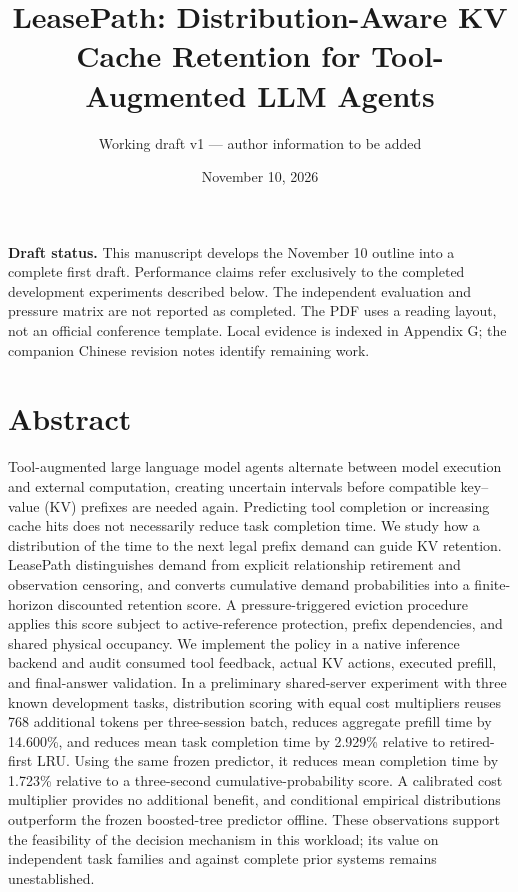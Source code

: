 \documentclass[
  english,
  10pt,
]{article}
\title{LeasePath: Distribution-Aware KV Cache Retention for
Tool-Augmented LLM Agents}
\author{Working draft v1 --- author information to be added}
\date{November 10, 2026}
\begin{document}
\maketitle

\textbf{Draft status.} This manuscript develops the November 10 outline
into a complete first draft. Performance claims refer exclusively to the
completed development experiments described below. The independent
evaluation and pressure matrix are not reported as completed. The PDF
uses a reading layout, not an official conference template. Local
evidence is indexed in Appendix G; the companion Chinese revision notes
identify remaining work.

\section{Abstract}\label{abstract}

Tool-augmented large language model agents alternate between model
execution and external computation, creating uncertain intervals before
compatible key--value (KV) prefixes are needed again. Predicting tool
completion or increasing cache hits does not necessarily reduce task
completion time. We study how a distribution of the time to the next
legal prefix demand can guide KV retention. LeasePath distinguishes
demand from explicit relationship retirement and observation censoring,
and converts cumulative demand probabilities into a finite-horizon
discounted retention score. A pressure-triggered eviction procedure
applies this score subject to active-reference protection, prefix
dependencies, and shared physical occupancy. We implement the policy in
a native inference backend and audit consumed tool feedback, actual KV
actions, executed prefill, and final-answer validation. In a preliminary
shared-server experiment with three known development tasks,
distribution scoring with equal cost multipliers reuses 768 additional
tokens per three-session batch, reduces aggregate prefill time by
14.600\%, and reduces mean task completion time by 2.929\% relative to
retired-first LRU. Using the same frozen predictor, it reduces mean
completion time by 1.723\% relative to a three-second
cumulative-probability score. A calibrated cost multiplier provides no
additional benefit, and conditional empirical distributions outperform
the frozen boosted-tree predictor offline. These observations support
the feasibility of the decision mechanism in this workload; its value on
independent task families and against complete prior systems remains
unestablished.
\end{document}

